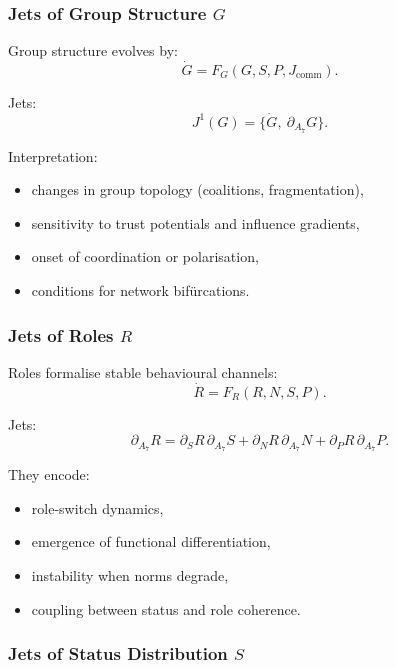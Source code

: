 \subsubsection{Jets of Group Structure \texorpdfstring{$G$}{G}}

Group structure evolves by:
\[
\dot{G} = F_G(G,S,P,J_{\mathrm{comm}}).
\]

Jets:
\[
J^1(G) = \{\dot{G},\ \partial_{A_7}G\}.
\]

Interpretation:
\begin{itemize}
    \item changes in group topology (coalitions, fragmentation),
    \item sensitivity to trust potentials and influence gradients,
    \item onset of coordination or polarisation,
    \item conditions for network bifürcations.
\end{itemize}


\subsubsection{Jets of Roles \texorpdfstring{$R$}{R}}

Roles formalise stable behavioural channels:
\[
\dot{R}=F_R(R,N,S,P).
\]

Jets:
\[
\partial_{A_7}R
=
\partial_{S}R\,\partial_{A_7}S
+\partial_{N}R\,\partial_{A_7}N
+\partial_{P}R\,\partial_{A_7}P.
\]

They encode:
\begin{itemize}
    \item role-switch dynamics,
    \item emergence of functional differentiation,
    \item instability when norms degrade,
    \item coupling between status and role coherence.
\end{itemize}


\subsubsection{Jets of Status Distribution \texorpdfstring{$S$}{S}}

